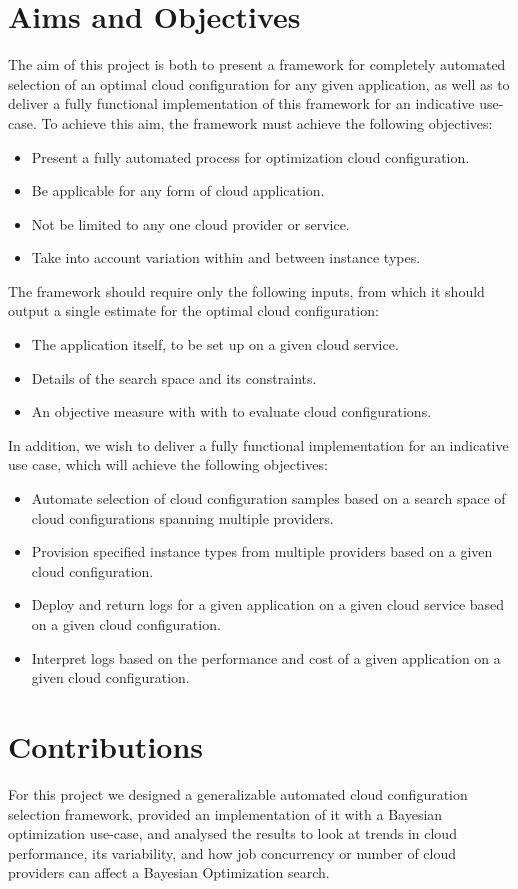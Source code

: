 \documentclass{report}
\begin{document}
\section{Aims and Objectives}
The aim of this project is both to present a framework for completely automated selection of an optimal cloud configuration for any given application, as well as to deliver a fully functional implementation of this framework for an indicative use-case. To achieve this aim, the framework must achieve the following objectives:
\begin{itemize}
\item Present a fully automated process for optimization cloud configuration.
\item Be applicable for any form of cloud application.
\item Not be limited to any one cloud provider or service.
\item Take into account variation within and between instance types.
\end{itemize}
The framework should require only the following inputs, from which it should output a single estimate for the optimal cloud configuration:
\begin{itemize}
\item The application itself, to be set up on a given cloud service.
\item Details of the search space and its constraints.
\item An objective measure with with to evaluate cloud configurations.
\end{itemize}
In addition, we wish to deliver a fully functional implementation for an indicative use case, which will achieve the following objectives:
\begin{itemize}
\item Automate selection of cloud configuration samples based on a search space of cloud configurations spanning multiple providers.
\item Provision specified instance types from multiple providers based on a given cloud configuration.
\item Deploy and return logs for a given application on a given cloud service based on a given cloud configuration.
\item Interpret logs based on the performance and cost of a given application on a given cloud configuration.
\end{itemize}
\section{Contributions}
For this project we designed a generalizable automated cloud configuration selection framework, provided an implementation of it with a Bayesian optimization use-case, and analysed the results to look at trends in cloud performance, its variability, and how job concurrency or number of cloud providers can affect a Bayesian Optimization search.
\end{document}
